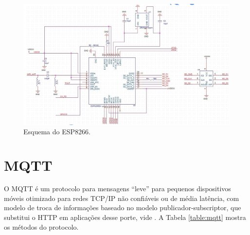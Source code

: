 \documentclass[
	12pt,				%
	openright,			%
	twoside,			%
	a4paper,			%
	english,			%
	french,				%
	spanish,			%
	brazil				%
	]{abntex2}
\begin{document}
\begin{figure}[h!]
    \centering
    \includegraphics[width=\linewidth]{esp8266}
    \caption{Esquema do ESP8266.}
    \label{fig:esp8266}
\end{figure}

\section{MQTT}

O MQTT é um protocolo para mensagens ``leve'' para pequenos dispositivos móveis otimizado para redes TCP/IP não confiáveis ou de média latência, com modelo de troca de informações baseado no modelo publicador-subscriptor, que substitui o HTTP em aplicações desse porte, vide . A Tabela \ref{table:mqtt} mostra os métodos do protocolo.
\end{document}
